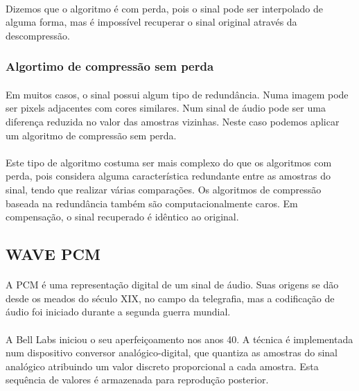 \documentclass[a4paper,12pt]{article}
\begin{document}
\paragraph{}
Dizemos que o algoritmo é com perda, pois o sinal pode ser interpolado de alguma forma, mas é impossível recuperar o sinal original através da descompressão.

\subsubsection{Algortimo de compressão sem perda}

\paragraph{}
Em muitos casos, o sinal possui algum tipo de redundância. Numa imagem pode ser pixels adjacentes com cores similares. Num sinal de áudio pode ser uma diferença reduzida no valor das amostras vizinhas. Neste caso podemos aplicar um algoritmo de compressão sem perda.

\paragraph{}
Este tipo de algoritmo costuma ser mais complexo do que os algoritmos com perda, pois considera alguma característica redundante entre as amostras do sinal, tendo que realizar várias comparações. Os algoritmos de compressão baseada na redundância também são computacionalmente caros. Em compensação, o sinal recuperado é idêntico ao original.

\subsection{WAVE PCM}

\paragraph{}
A PCM é uma representação digital de um sinal de áudio. Suas origens se dão desde os meados do século XIX, no campo da telegrafia, mas a codificação de áudio foi iniciado durante a segunda guerra mundial.

\paragraph{}
A Bell Labs iniciou o seu aperfeiçoamento nos anos 40. A técnica é implementada num dispositivo conversor analógico-digital, que quantiza as amostras do sinal analógico atribuindo um valor discreto proporcional a cada amostra. Esta sequência de valores é armazenada para reprodução posterior.
\end{document}
